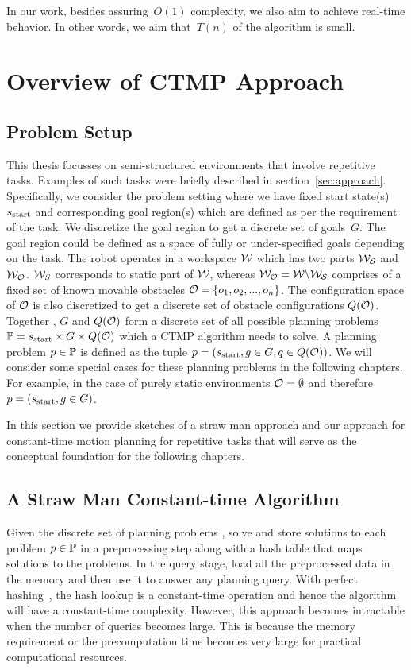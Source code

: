 \documentclass[a4paper]{report}
\begin{document}
In our work, besides assuring~$O(1)$ complexity, we also aim to achieve real-time behavior. In other words, we aim that~$T(n)$ of the algorithm is small.

\section{Overview of CTMP Approach}
\subsection{Problem Setup}
This thesis focusses on semi-structured environments that involve repetitive tasks. Examples of such tasks were briefly described in section~\ref{sec:approach}. Specifically, we consider the problem setting where we have fixed start state(s)~$s_{\textrm{start}}$ and corresponding goal region(s) which are defined as per the requirement of the task. We discretize the goal region to get a discrete set of goals~$G$. The goal region could be defined as a space of fully or under-specified goals depending on the task. The robot operates in a workspace $\mathcal{W}$ which has two parts $\mathcal{W}_\mathcal{S}$ and $\mathcal{W}_\mathcal{O}$. $\mathcal{W}_S$ corresponds to static part of $\mathcal{W}$, whereas $\mathcal{W}_\mathcal{O} = \mathcal{W} \backslash \mathcal{W}_\mathcal{S}$ comprises of a fixed set of known movable obstacles $\mathcal{O} = \{o_1, o_2, ... , o_n\}$. The configuration space of $\mathcal{O}$ is also discretized to get a discrete set of obstacle configurations $Q(\mathcal{O})$. Together \Sstart, $G$ and $Q(\mathcal{O})$ form a discrete set of all possible planning problems $\mathbb{P} = s_{\textrm{start}} \times G \times Q(\mathcal{O})$ which a CTMP algorithm needs to solve. A planning problem $p \in \mathbb{P}$ is defined as the tuple $p = (s_{\text{start}}, g \in G, q \in Q(\mathcal{O}))$. We will consider some special cases for these planning problems in the following chapters. For example, in the case of purely static environments $\mathcal{O} = \emptyset$ and therefore $p = (s_{\text{start}}, g \in G)$.

In this section we provide sketches of a straw man approach and our approach for constant-time motion planning for repetitive tasks that will serve as the conceptual foundation for the following chapters.

\subsection{A Straw Man Constant-time Algorithm}
Given the discrete set of planning problems \pset, solve and store solutions to each problem $p \in \mathbb{P}$ in a preprocessing step along with a hash table that maps solutions to the problems. In the query stage, load all the preprocessed data in the memory and then use it to answer any planning query.
With perfect hashing~\cite{czech1997perfect}, the hash lookup is a constant-time operation and hence the algorithm will have a constant-time complexity. However, this approach becomes intractable when the number of queries becomes large. This is because the memory requirement or the precomputation time becomes very large for practical computational resources.
\end{document}
